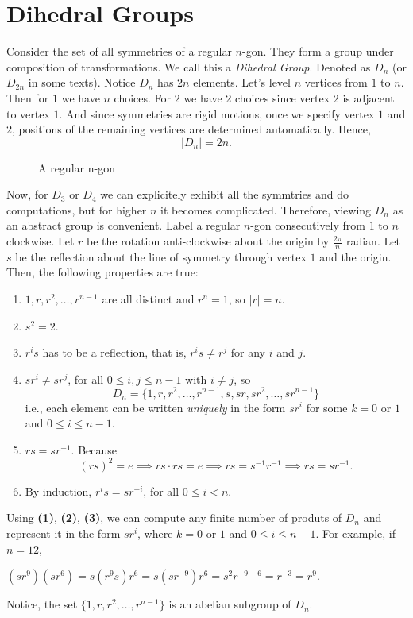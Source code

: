 \section{Dihedral Groups}
Consider the set of all symmetries of a regular $n$-gon. They form a group under composition of transformations. We call this a \textit{Dihedral Group}. Denoted as $D_n$ (or $D_{2n}$ in some texts). Notice $D_n$ has $2n$ elements. Let's level $n$ vertices from $1$ to $n$. Then for $1$ we have $n$ choices. For $2$ we have $2$ choices since vertex $2$ is adjacent to vertex $1$. And since symmetries are rigid motions, once we specify vertex $1$ and $2$, positions of the remaining vertices are determined automatically. Hence,
$$|D_n| = 2n.$$
\begin{figure}[H]
    \centering
    \def\svgwidth{0.6\columnwidth}
    \caption{A regular n-gon}
    \label{fig:n-gon}
\end{figure}
Now, for $D_3$ or $D_4$ we can explicitely exhibit all the symmtries and do computations, but for higher $n$ it becomes complicated. Therefore, viewing $D_n$ as an abstract group is convenient. Label a regular $n$-gon consecutively from $1$ to $n$ clockwise. Let $r$ be the rotation anti-clockwise about the origin by $\frac{2 \pi}{n}$ radian. Let $s$ be the reflection about the line of symmetry through vertex $1$ and the origin. Then, the following properties are true:
\begin{enumerate}
    \item \(1, r, r^2, \ldots, r^{n-1}\) are all distinct and \(r^n = 1\), so \(|r| = n\).
    \item \(s^2 = 2\).
    \item $r^is$ has to be a reflection, that is, \(r^is \neq r^j\) for any \(i\) and \(j\).
    \item \(sr^i \neq sr^j\), for all \(0 \leq i, j \leq n - 1\) with \(i \neq j\), so
    \[
    D_{n} = \{1, r, r^2, \ldots, r^{n-1}, s, sr, sr^2, \ldots, sr^{n-1}\}
    \]
    i.e., each element can be written \textit{uniquely} in the form \(sr^i\) for some \(k = 0\) or \(1\) and \(0 \leq i \leq n - 1\).
    \item \(rs = sr^{-1}\). Because \[(rs)^2 = e \implies rs \cdot rs = e \implies rs = s^{-1}r^{-1} \implies rs = sr^{-1}.\]
    \item By induction, \(r^i s = sr^{-i}\), for all \(0 \leq i < n\).
\end{enumerate}
Using \textbf{(1)}, \textbf{(2)}, \textbf{(3)}, we can compute any finite number of produts of \(D_{n}\) and represent it in the form \(sr^i\), where \(k = 0\) or \(1\) and \(0 \leq i \leq n - 1\). For example, if \(n = 12\),
\begin{eg}
$(sr^9)(sr^6) = s(r^9 s)r^6 = s(sr^{-9})r^6 = s^2 r^{-9+6} = r^{-3} = r^9.$
\end{eg}
Notice, the set $\{1, r, r^2, \ldots, r^{n-1}\}$ is an abelian subgroup of $D_n$.
